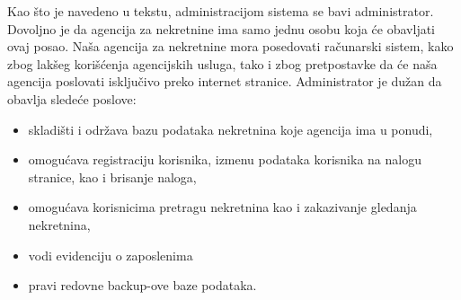 \documentclass[20pt]{article}
\begin{document}
\indent Kao \v {s}to je navedeno u tekstu, administracijom sistema se bavi administrator. Dovoljno je da agencija za nekretnine ima samo jednu osobu koja \' ce obavljati ovaj posao. Na\v {s}a agencija za nekretnine mora posedovati ra\v {c}unarski sistem, kako zbog lak\v {s}eg kori\v {s}\' cenja agencijskih usluga, tako i zbog pretpostavke da \'ce na\v {s}a agencija poslovati isklju\v {c}ivo preko internet stranice. Administrator je du\v {z}an da obavlja slede\' ce poslove:
\begin{itemize}
    \item skladi\v {s}ti i odr\v {z}ava bazu podataka nekretnina koje agencija ima u ponudi,
    \item omogu\' cava registraciju korisnika, izmenu podataka korisnika na nalogu stranice, kao i brisanje naloga,
    \item omogu\' cava korisnicima pretragu nekretnina kao i zakazivanje gledanja nekretnina,
    \item vodi evidenciju o zaposlenima
    \item pravi redovne backup-ove baze podataka.
\end{itemize}

\newpage
\end{document}

